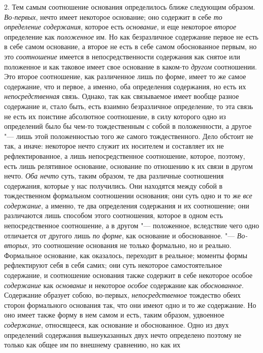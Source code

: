 2. Тем самым соотношение основания определилось ближе следующим образом.
{\em Во-первых}, нечто имеет некоторое основание; оно
содержит в себе {\em то определение содержания},
которое есть {\em основание}, и еще некоторое
{\em второе} определение как
{\em положенное} им. Но как безразличное содержание
первое не есть в себе самом основание, а второе не есть в себе самом
обоснованное первым, но это {\em соотношение} имеется в
непосредственности содержания как снятое или положенное и как таковое имеет
свое основание в каком-то {\em другом} соотношении. Это
второе соотношение, как различенное лишь по форме, имеет то же самое
содержание, что и первое, а именно, оба определения содержания, но есть их
{\em непосредственная} связь. Однако, так как
связываемое имеет вообще разное содержание и, стало быть, есть взаимно
безразличное определение, то эта связь не есть их поистине абсолютное
соотношение, в силу которого одно из определений было бы чем-то
тождественным с собой в положенности, а другое "--- лишь этой положенностью
того же самого тождественного. Дело обстоит не так, а иначе: некоторое
нечто служит их носителем и составляет их не рефлектированное, а лишь
непосредственное соотношение, которое, поэтому, есть лишь релятивное
основание, основание по отношению к их связи в другом нечто.
{\em Оба нечто} суть, таким образом, те два различные
соотношения содержания, которые у нас получились. Они находятся между собой
в тождественном формальном соотношении основания; они суть одно и то же
{\em все содержание}, а именно, те два определения
содержания и их соотношение; они различаются лишь способом этого
соотношения, которое в одном есть непосредственное соотношение, а в другом
"--- положенное, вследствие чего одно отличается от другого лишь
{\em по форме}, как основание и обоснованное. "---
{\em Во-вторых}, это соотношение основания не только
формально, но и реально. Формальное основание, как оказалось, переходит в
реальное; моменты формы рефлектируют себя в себя самих; они суть некоторое
самостоятельное содержание, и соотношение основания также содержит в себе
некоторое особое {\em содержание} как {\em основание} и некоторое
{\em особое} содержание как {\em обоснованное}. Содержание образует собою,
во-первых, {\em непосредственное} тождество обеих
сторон формального основания так, что они имеют одно и то же содержание. Но
оно имеет также форму в нем самом и есть, таким образом, удвоенное
{\em содержание}, относящееся, как основание и
обоснованное. Одно из двух определений содержания вышеуказанных двух нечто
определено поэтому не только как общее им по внешнему сравнению, но как их
